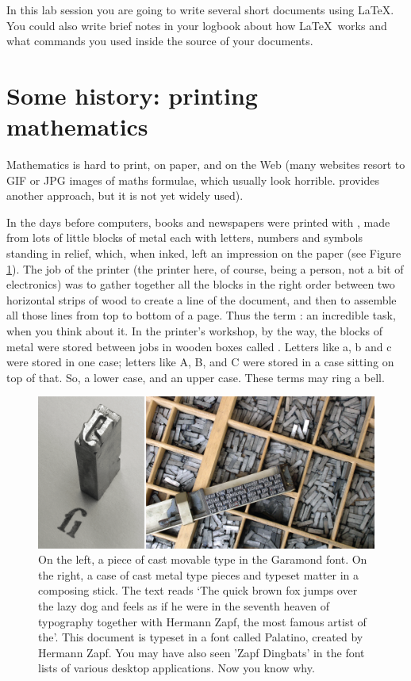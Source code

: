 \begin{refsection}
In this lab session you are going to write several short  documents using \LaTeX. You could also write brief notes in your logbook about how \LaTeX\ works and what commands you used inside the source of your documents.

\section{Some history: printing mathematics}

Mathematics is hard to print, on paper, and on the Web (many websites resort to GIF or JPG images of maths formulae, which usually look horrible.  provides another approach, but it is not yet widely used).

In the days before computers, books and newspapers were printed with , made from lots of little blocks of metal each with letters, numbers and symbols standing in relief, which, when inked, left an impression on the paper (see Figure \ref{figure:movabletype}). The job of the printer (the printer here, of course, being a person, not a bit of electronics) was to gather together all the blocks in the right order between two horizontal strips of wood to create a line of the document, and then to assemble all those lines from top to bottom of a page. Thus the term : an incredible task, when you think about it. In the printer's workshop, by the way, the blocks of metal were stored between jobs in wooden boxes called . Letters like a, b and c were stored in one case; letters like A, B, and C were stored in a case sitting on top of that. So, a lower case, and an upper case. These terms may ring a bell.

\begin{figure}
\centerline{\includegraphics[width=12cm]{images/movable-type.png}}
\caption{On the left, a piece of cast movable type in the Garamond font. On the right, a case of cast metal type pieces and typeset matter in a composing stick. The text reads `The quick brown fox jumps over the lazy dog and feels as if he were in the seventh heaven of typography together with Hermann Zapf, the most famous artist of the'. This document is typeset in a font called Palatino, created by Hermann Zapf. You may have also seen 'Zapf Dingbats' in the font lists of various desktop applications. Now you know why.} \label{figure:movabletype}
\end{figure}


\end{refsection}
